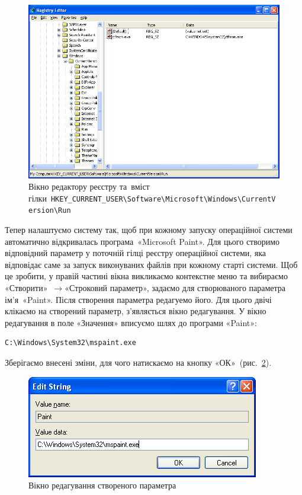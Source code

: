 \documentclass[
	a4paper,
	oneside,
	DIV = 12,
	fontsize = 13pt,
	headings = normal,
]{scrartcl}
\newcommand{\Mytextrightarrow}{$\rightarrow$\hspace{0.25em}}
\begin{document}
		\begin{figure}[!htbp]
			\centering
			\includegraphics[height = 12\baselineskip]{../01-solution/y03s01-pcdiag-lab-07-p01.png}
			\caption{Вікно редактору реєстру та~вміст гілки~\texttt{\textenglish{HKEY\_CURRENT\_USER\textbackslash{}\-Software\textbackslash{}\-Microsoft\textbackslash{}\-Windows\textbackslash{}\-CurrentVersion\textbackslash{}\-Run}}}
			\label{fig:regedit-curversion-run}
		\end{figure}

		Тепер налаштуємо систему так, щоб при кожному запуску операційної системи автоматично відкривалась програма~«\textenglish{Microsoft Paint}». Для цього створимо відповідний параметр у поточній гілці реєстру операційної системи, яка відповідає саме за запуск виконуваних файлів при кожному старті системи. Щоб це зробити, у правій частині вікна викликаємо контекстне меню та вибираємо «Створити»~\Mytextrightarrow «Строковий параметр», задаємо для створюваного параметра ім'я~«\textenglish{Paint}». Після створення параметра редагуемо його. Для цього двічі клікаємо на створений параметр, з'являється вікно редагування. У вікно редагування в поле «Значення» вписуємо шлях до програми «\textenglish{Paint}»:
		\begin{verbatim}
C:\Windows\System32\mspaint.exe
		\end{verbatim}
		Зберігаємо внесені зміни, для чого натискаємо на кнопку «ОК»~(рис.~\ref{fig:parameter-edit}).

		\begin{figure}[!htbp]
			\centering
			\includegraphics[height = 6\baselineskip]{../01-solution/y03s01-pcdiag-lab-07-p02.png}
			\caption{Вікно редагування створеного параметра}
			\label{fig:parameter-edit}
		\end{figure}
\end{document}
